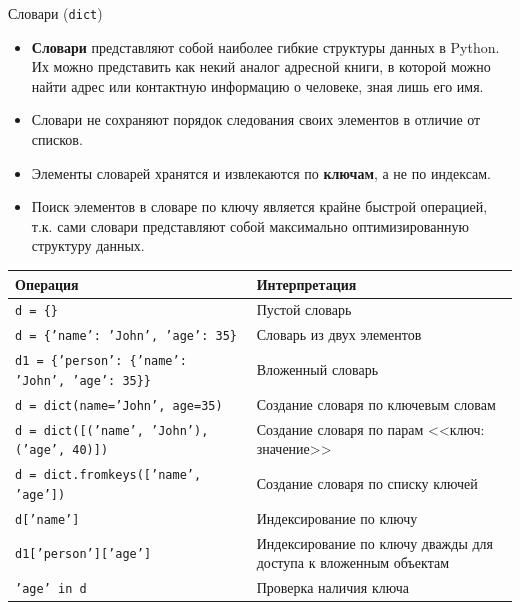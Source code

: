 \documentclass[aspectratio=169, mathserif]{beamer}%
\begin{document}
\begin{frame}[fragile]{Словари (\texttt{dict})}
\scriptsize
\begin{itemize}
\item \textbf{Словари} представляют собой  наиболее гибкие структуры данных в Python. Их можно представить как некий аналог адресной книги, в которой можно найти адрес или контактную информацию о человеке, зная лишь его имя. 

\item Словари не сохраняют порядок следования своих элементов в отличие от списков. 

\item Элементы  словарей хранятся и извлекаются по \textcolor{extraorange}{\textbf{ключам}}, а не по индексам. 

\item Поиск элементов в словаре по ключу является крайне быстрой операцией, т.к. сами словари представляют собой максимально оптимизированную структуру данных.

\end{itemize}

\begin{table}[h!]
\centering
\scriptsize
\begin{tabular}{|p{}|p{}|}
	\hline
	\textbf{Операция} & \textbf{Интерпретация} \\
	\hline
	\texttt{d = \{\}} & Пустой словарь \\
	\texttt{d = \{\textcolor{ipython_red}{'name'{}}: \textcolor{ipython_red}{'John'{}}, \textcolor{ipython_red}{'age'{}}: 35\}} & Словарь из двух элементов \\
	\texttt{d1 = \{\textcolor{ipython_red}{'person'{}}: \{\textcolor{ipython_red}{'name'{}}: \textcolor{ipython_red}{'John'{}}, \textcolor{ipython_red}{'age'{}}: 35\}\}} & Вложенный словарь	 \\
	\texttt{d = dict(name=\textcolor{ipython_red}{'John'{}}, age=35)} & Создание словаря по ключевым словам \\
	\texttt{d = dict([(\textcolor{ipython_red}{'name'{}}, \textcolor{ipython_red}{'John'{}}), (\textcolor{ipython_red}{'age'{}}, 40)])} & Создание словаря по парам <<ключ: значение>> \\
	\texttt{d = dict.fromkeys([\textcolor{ipython_red}{'name'{}}, \textcolor{ipython_red}{'age'{}}])} & Создание словаря по списку ключей \\
	\texttt{d[\textcolor{ipython_red}{'name'{}}]} & Индексирование по ключу \\
	\texttt{d1[\textcolor{ipython_red}{'person'{}}][\textcolor{ipython_red}{'age'{}}]} & Индексирование по ключу дважды для доступа к вложенным объектам \\
	\texttt{\textcolor{ipython_red}{'age'{}} \textcolor{ipython_green}{in} d} & Проверка наличия ключа \\
	\hline
	
\end{tabular}

\end{table}
\vfill
\end{frame}
\end{document}
